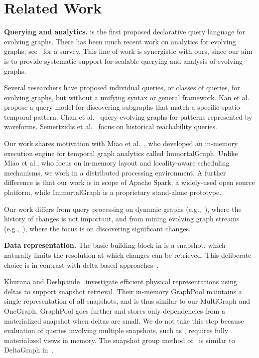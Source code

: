 \section{Related Work}
\label{sec:related}

{\bf Querying and analytics.}  \ql is the first proposed declarative
query language for evolving graphs.  There has been much recent work
on analytics for evolving graphs,
see~\cite{DBLP:journals/csur/AggarwalS14} for a survey. This line of
work is synergistic with ours, since our aim is to provide systematic
support for scalable querying and analysis of evolving graphs.

Several researchers have proposed individual queries, or classes of
queries, for evolving graphs, but without a unifying syntax or general
framework.  Kan et al.~\cite{Kan2009} propose a query model for
discovering subgraphs that match a specific spatio-temporal pattern.
Chan et al.~\cite{Chan2008} query evolving graphs for patterns
represented by waveforms.  Semertzidis et al.~\cite{Semertzidis2015}
focus on historical reachability queries.

Our work shares motivation with Miao et
al.~\cite{DBLP:journals/tos/MiaoHLWYZPCC15}, who developed an
in-memory execution engine for temporal graph analytics called
ImmortalGraph.  Unlike Miao et al., who focus on in-memory layout and
locality-aware scheduling mechanisms, we work in a distributed
processing environment.  A further difference is that our work is in
scope of Apache Spark, a widely-used open source platform, while
ImmortalGraph is a proprietary stand-alone prototype.

Our work differs from query processing on dynamic graphs
(e.g.,~\cite{Mondal2012}), where the history of changes is not
important, and from mining evolving graph streams
(e.g.,~\cite{Liu2010}), where the focus is on discovering significant
changes.

{\bf Data representation.}  The basic building block in \ql is a
snapshot, which naturally limits the resolution at which changes can
be retrieved. This deliberate choice is in contrast with delta-based
approaches~\cite{Khurana2013,Koloniari2012,DBLP:journals/tos/MiaoHLWYZPCC15}.

Khurana and Deshpande~\cite{Khurana2013} investigate efficient
physical representations using deltas to support snapshot retrieval.
Their in-memory GraphPool maintains a single representation of all
snapshots, and is thus similar to our MultiGraph and OneGraph.
GraphPool goes further and stores only dependencies from a
materialized snapshot when deltas are small.  We do not take
this step because evaluation of queries involving multiple snapshots,
such as , requires fully materialized views in memory.
The snapshot group method of~\cite{DBLP:journals/tos/MiaoHLWYZPCC15}
is similar to DeltaGraph in~\cite{Khurana2013}.

